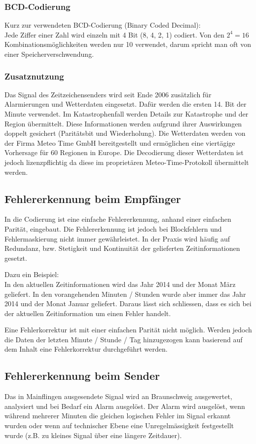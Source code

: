 \subsubsection{BCD-Codierung}
Kurz zur verwendeten BCD-Codierung (Binary Coded Decimal):\\
Jede Ziffer einer Zahl wird einzeln mit 4 Bit (8, 4, 2, 1) codiert. Von den $2^4 = 16$ Kombinationsmöglichkeiten werden nur 10 verwendet, darum spricht man oft von einer Speicherverschwendung.

\subsubsection{Zusatznutzung}
Das Signal des Zeitzeichensenders wird seit Ende 2006 zusätzlich für Alarmierungen und Wetterdaten eingesetzt. Dafür werden die ersten 14. Bit der Minute verwendet. Im Katastrophenfall werden Details zur Katastrophe und der Region übermittelt. Diese Informationen werden aufgrund ihrer Auswirkungen doppelt gesichert (Paritätsbit und Wiederholung). Die Wetterdaten werden von der Firma Meteo Time GmbH bereitgestellt und ermöglichen eine viertägige Vorhersage für 60 Regionen in Europe. Die Decodierung dieser Wetterdaten ist jedoch lizenzpflichtig da diese im proprietären Meteo-Time-Protokoll übermittelt werden.

\subsection{Fehlererkennung beim Empfänger}
In die Codierung ist eine einfache Fehlererkennung, anhand einer einfachen Parität, eingebaut. Die Fehlererkennung ist jedoch bei Blockfehlern und Fehlermaskierung nicht immer gewährleistet. In der Praxis wird häufig auf Redundanz, bzw. Stetigkeit und Kontinuität der gelieferten Zeitinformationen gesetzt.

Dazu ein Beispiel:\\
In den aktuellen Zeitinformationen wird das Jahr 2014 und der Monat März geliefert. In den vorangehenden Minuten / Stunden wurde aber immer das Jahr 2014 und der Monat Januar geliefert. Daraus lässt sich schliessen, dass es sich bei der aktuellen Zeitinformation um einen Fehler handelt.

Eine Fehlerkorrektur ist mit einer einfachen Parität nicht möglich. Werden jedoch die Daten der letzten Minute / Stunde / Tag hinzugezogen kann basierend auf dem Inhalt eine Fehlerkorrektur durchgeführt werden.

\subsection{Fehlererkennung beim Sender}
Das in Mainflingen ausgesendete Signal wird an Braunschweig ausgewertet, analysiert und bei Bedarf ein Alarm ausgelöst. Der Alarm wird ausgelöst, wenn während mehrerer Minuten die gleichen logischen Fehler im Signal erkannt wurden oder wenn auf technischer Ebene eine Unregelmässigkeit festgestellt wurde (z.B. zu kleines Signal über eine längere Zeitdauer).


